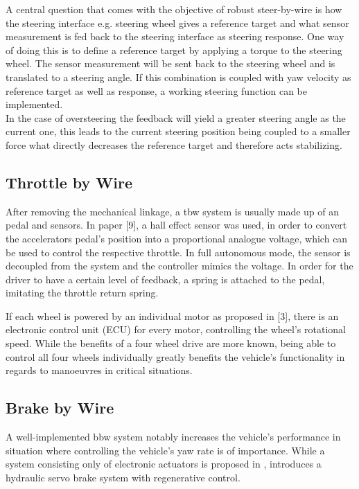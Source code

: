 \documentclass[conference]{IEEEtran}
\begin{document}
A central question that comes with the objective of robust steer-by-wire is how the steering interface e.g. steering wheel gives a reference target and what sensor measurement is fed back to the steering interface as steering response. One way of doing this is to define a reference target by applying a torque to the steering wheel. The sensor measurement will be sent back to the steering wheel and is translated to a steering angle. If this combination is coupled with yaw velocity as reference 
target as well as response, a working steering function can be implemented. \\
In the case of oversteering the feedback will yield a greater steering angle as the current one, this leads to the current steering position being coupled to a smaller force what directly decreases the reference target and therefore acts stabilizing.

\subsection{Throttle by Wire}

After removing the mechanical linkage, a tbw system is usually made up of an pedal and sensors. In paper [9], a hall effect sensor was used, in order to convert the accelerators pedal's position into a proportional analogue voltage, which can be used to control the respective throttle. In full autonomous mode, the sensor is decoupled from the system and the controller mimics the voltage. In order for the driver to have a certain level of feedback, a spring is attached to the pedal, imitating the throttle return spring. 

If each wheel is powered by an individual motor as proposed in [3], there is an electronic control unit (ECU) for every motor, controlling the wheel's rotational speed. While the benefits of a four wheel drive are more known, being able to control all four wheels individually greatly benefits the vehicle's functionality in regards to manoeuvres in critical situations. 

\subsection{Brake by Wire}

A well-implemented bbw system notably increases the vehicle's performance in situation where controlling the vehicle's yaw rate is of importance. While a system consisting only of electronic actuators is proposed in \cite{Weidong}, \cite{Aoki} introduces a hydraulic servo brake system with regenerative control. 
\end{document}

